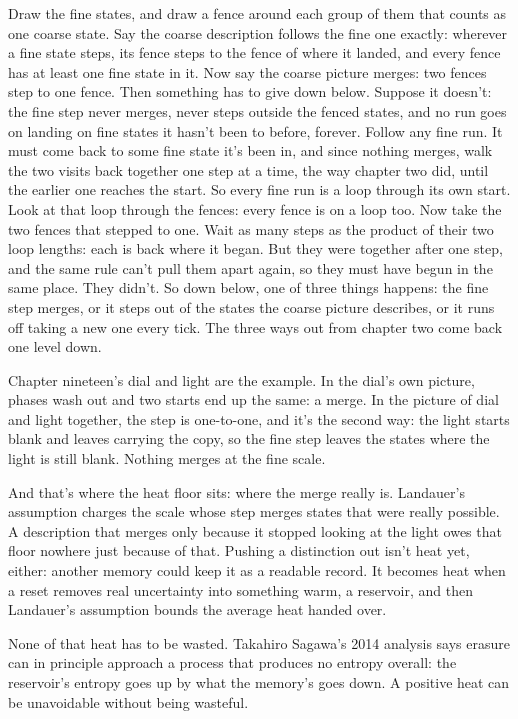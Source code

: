 \documentclass[11pt,twoside]{article}
\theoremstyle{thielethm}
\theoremstyle{thieledef}
\theoremstyle{thieledef}
\theoremstyle{thieledef}
\theoremstyle{thielethm}
\theoremstyle{thieleobs}
\theoremstyle{thielethm}
\begin{document}
Draw the fine states, and draw a fence around each group of them that counts as one coarse state. Say the coarse description follows the fine one exactly: wherever a fine state steps, its fence steps to the fence of where it landed, and every fence has at least one fine state in it. Now say the coarse picture merges: two fences step to one fence. Then something has to give down below. Suppose it doesn't: the fine step never merges, never steps outside the fenced states, and no run goes on landing on fine states it hasn't been to before, forever. Follow any fine run. It must come back to some fine state it's been in, and since nothing merges, walk the two visits back together one step at a time, the way chapter two did, until the earlier one reaches the start. So every fine run is a loop through its own start. Look at that loop through the fences: every fence is on a loop too. Now take the two fences that stepped to one. Wait as many steps as the product of their two loop lengths: each is back where it began. But they were together after one step, and the same rule can't pull them apart again, so they must have begun in the same place. They didn't. So down below, one of three things happens: the fine step merges, or it steps out of the states the coarse picture describes, or it runs off taking a new one every tick. The three ways out from chapter two come back one level down.

Chapter nineteen's dial and light are the example. In the dial's own picture, phases wash out and two starts end up the same: a merge. In the picture of dial and light together, the step is one-to-one, and it's the second way: the light starts blank and leaves carrying the copy, so the fine step leaves the states where the light is still blank. Nothing merges at the fine scale.

And that's where the heat floor sits: where the merge really is. Landauer's assumption charges the scale whose step merges states that were really possible. A description that merges only because it stopped looking at the light owes that floor nowhere just because of that. Pushing a distinction out isn't heat yet, either: another memory could keep it as a readable record. It becomes heat when a reset removes real uncertainty into something warm, a reservoir, and then Landauer's assumption bounds the average heat handed over.

None of that heat has to be wasted. Takahiro Sagawa's 2014 analysis says erasure can in principle approach a process that produces no entropy overall: the reservoir's entropy goes up by what the memory's goes down. A positive heat can be unavoidable without being wasteful.
\end{document}
